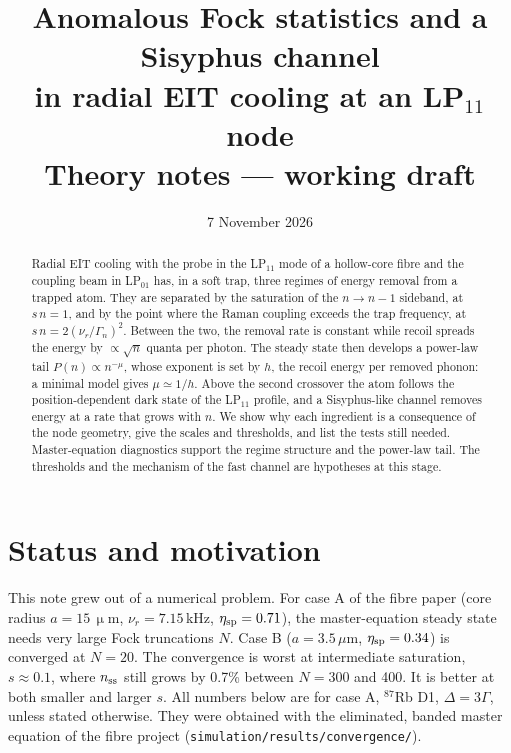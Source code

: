 \documentclass[11pt,a4paper]{article}
\title{Anomalous Fock statistics and a Sisyphus channel\\in radial EIT cooling at an LP$_{11}$ node\\[3pt]
\large Theory notes --- working draft}
\author{}
\date{7 November 2026}
\newcommand{\etasp}{\eta_{\rm sp}}
\newcommand{\nur}{\nu_r}
\newcommand{\micro}{\upmu}
\newcommand{\SI}[2]{\ensuremath{#1\,\mathrm{#2}}}
\begin{document}
\maketitle

\begin{abstract}
Radial EIT cooling with the probe in the LP$_{11}$ mode of a hollow-core fibre and the coupling beam in LP$_{01}$ has, in a soft trap, three regimes of energy removal from a trapped atom. They are separated by the saturation of the $n\to n-1$ sideband, at $s\,n=1$, and by the point where the Raman coupling exceeds the trap frequency, at $s\,n=2(\nur/\Gamma_n)^2$. Between the two, the removal rate is constant while recoil spreads the energy by $\propto\sqrt n$ quanta per photon. The steady state then develops a power-law tail $P(n)\propto n^{-\mu}$, whose exponent is set by $h$, the recoil energy per removed phonon: a minimal model gives $\mu\simeq1/h$. Above the second crossover the atom follows the position-dependent dark state of the LP$_{11}$ profile, and a Sisyphus-like channel removes energy at a rate that grows with $n$. We show why each ingredient is a consequence of the node geometry, give the scales and thresholds, and list the tests still needed. Master-equation diagnostics support the regime structure and the power-law tail. The thresholds and the mechanism of the fast channel are hypotheses at this stage.
\end{abstract}

\tableofcontents

\section{Status and motivation}
This note grew out of a numerical problem. For case A of the fibre paper (core radius $a=\SI{15}{\micro m}$, $\nur=7.15$\,kHz, $\etasp=0.71$), the master-equation steady state needs very large Fock truncations $N$. Case B ($a=3.5\,\mu$m, $\etasp=0.34$) is converged at $N=20$. The convergence is worst at intermediate saturation, $s\approx0.1$, where $n_{\rm ss}$ still grows by 0.7\% between $N=300$ and 400. It is better at both smaller and larger $s$. All numbers below are for case A, $^{87}$Rb D1, $\Delta=3\Gamma$, unless stated otherwise. They were obtained with the eliminated, banded master equation of the fibre project (\texttt{simulation/results/convergence/}).
\end{document}
